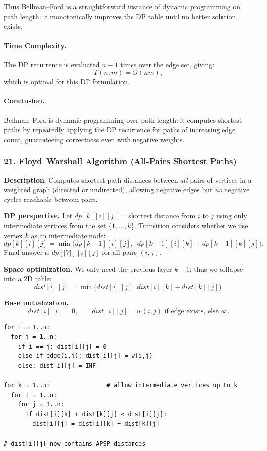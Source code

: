 \documentclass[9pt]{extarticle}
\begin{document}
Thus Bellman--Ford is a straightforward instance of dynamic programming on path length:
it monotonically improves the DP table until no better solution exists.

\paragraph{Time Complexity.}
The DP recurrence is evaluated $n-1$ times over the edge set, giving:
\[
  T(n,m) = O(nm),
\]
which is optimal for this DP formulation.

\paragraph{Conclusion.}
Bellman--Ford is dynamic programming over path length:  
it computes shortest paths by repeatedly applying the DP recurrence for paths
of increasing edge count, guaranteeing correctness even with negative weights.

\subsubsection{21. Floyd–Warshall Algorithm (All-Pairs Shortest Paths)}
\textbf{Description.} Computes shortest-path distances between \emph{all} pairs of vertices
in a weighted graph (directed or undirected), allowing negative edges but \emph{no}
negative cycles reachable between pairs.

\textbf{DP perspective.}  
Let \(dp[k][i][j]\) = shortest distance from \(i\) to \(j\) using only intermediate
vertices from the set \(\{1,\dots,k\}\).  
Transition considers whether we use vertex \(k\) as an intermediate node:
\[
dp[k][i][j] = \min\bigl(dp[k-1][i][j],\;\; dp[k-1][i][k] + dp[k-1][k][j]\bigr).
\]
Final answer is \(dp[|V|][i][j]\) for all pairs \((i,j)\).

\textbf{Space optimization.}  
We only need the previous layer \(k-1\); thus we collapse into a 2D table:
\[
dist[i][j] = \min\bigl(dist[i][j],\; dist[i][k] + dist[k][j]\bigr).
\]

\textbf{Base initialization.}
\[
dist[i][i] = 0,\qquad
dist[i][j] = w(i,j) \text{ if edge exists, else } \infty.
\]

\begin{verbatim}
for i = 1..n:
  for j = 1..n:
    if i == j: dist[i][j] = 0
    else if edge(i,j): dist[i][j] = w(i,j)
    else: dist[i][j] = INF

for k = 1..n:                # allow intermediate vertices up to k
  for i = 1..n:
    for j = 1..n:
      if dist[i][k] + dist[k][j] < dist[i][j]:
        dist[i][j] = dist[i][k] + dist[k][j]

# dist[i][j] now contains APSP distances
\end{verbatim}
\end{document}
